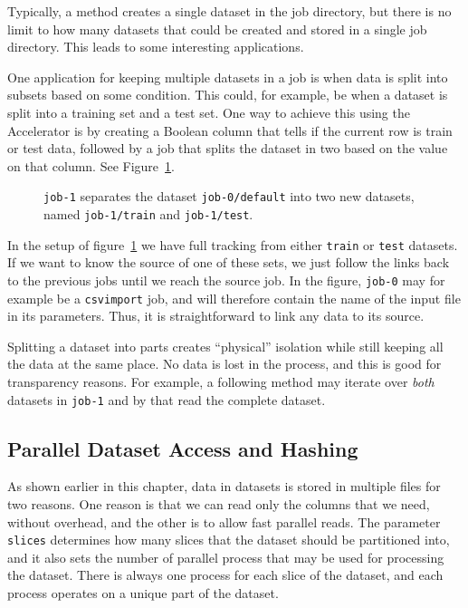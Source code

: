 Typically, a method creates a single dataset in the job directory, but
there is no limit to how many datasets that could be created and
stored in a single job directory.  This leads to some interesting
applications.

One application for keeping multiple datasets in a job is when data is
split into subsets based on some condition.  This could, for example,
be when a dataset is split into a training set and a test set.  One
way to achieve this using the Accelerator is by creating a Boolean
column that tells if the current row is train or test data, followed
by a job that splits the dataset in two based on the value on that
column.  See Figure~\ref{fig:dep_dataset_csvimport_chain}.

\begin{figure}[h!]
  \hspace{1cm}
  
  \caption{\texttt{job-1} separates the dataset
    \texttt{job-0/default} into two new datasets, named
    \texttt{job-1/train} and \texttt{job-1/test}.}
  \label{fig:dep_dataset_csvimport_chain}
\end{figure}


In the setup of figure~\ref{fig:dep_dataset_csvimport_chain} we have
full tracking from either \texttt{train} or \texttt{test} datasets.
If we want to know the source of one of these sets, we just follow the
links back to the previous jobs until we reach the source job.  In the
figure, \texttt{job-0} may for example be a \texttt{csvimport} job,
and will therefore contain the name of the input file in its
parameters.  Thus, it is straightforward to link any data to its
source.

Splitting a dataset into parts creates ``physical'' isolation while
still keeping all the data at the same place.  No data is lost in the
process, and this is good for transparency reasons.  For example, a
following method may iterate over \textsl{both} datasets in
\texttt{job-1} and by that read the complete dataset.



\subsection{Parallel Dataset Access and Hashing}
As shown earlier in this chapter, data in datasets is stored in
multiple files for two reasons.  One reason is that we can read only
the columns that we need, without overhead, and the other is to allow
fast parallel reads.  The parameter \texttt{slices} determines how
many slices that the dataset should be partitioned into, and it also
sets the number of parallel process that may be used for processing
the dataset.  There is always one process for each slice of the
dataset, and each process operates on a unique part of the dataset.

